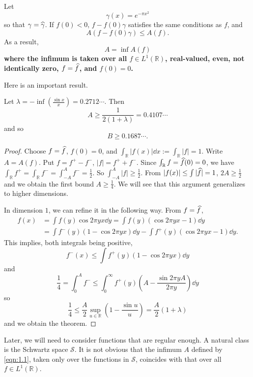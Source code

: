 Let
\[
    \gamma(x) = e^{-\pi x^2}
\]
so that $\gamma = \widehat{\gamma}$.
If $f(0) < 0$, $f - f(0)\gamma$ satisfies the same conditions as $f$, and
\[
    A(f - f(0)\gamma) \leq A(f).
\]
As a result,
\begin{equation}
\label{eqn:1.1}
    A = \inf A(f)
\end{equation}
\textbf{where the infimum is taken over all $f \in L^{1}(\mathbb{R})$, real-valued, even, not identically zero, $f = \widehat{f}$, and $f(0) = 0$.}

Here is an important result.

\begin{theorem}
\label{thm:1.1}
Let $\lambda = -\inf\left( \frac{\sin x}{x}\right) = 0.2712\cdots$.
Then
\[
    A \geq \frac{1}{2(1 + \lambda)} = 0.4107\cdots
\]
and so
\[
    B \geq 0.1687\cdots.
\]
\end{theorem}
\begin{proof}
Choose $f = \widehat{f}$, $f(0) = 0$, and $\int_{\mathbb{R}} |f(x)| \dd x := \int_{\mathbb{R}} |f| = 1$.
Write $A = A(f)$.
Put $f = f^{+} - f^{-}$, $|f| = f^{+} + f^{-}$.
Since $\int_{\mathbb{R}}f = \widehat{f}(0) = 0$, we have $\int_{\mathbb{R}} f^{+} = \int_{\mathbb{R}} f^{-} = \int_{-A}^{A} f^{-} = \frac{1}{2}$.
So $\int_{-A}^{A} |f| \geq \frac{1}{2}$.
From $|f(x)| \leq \int |\widehat{f}| = 1$, $2A \geq \frac{1}{2}$ and we obtain the first bound $A \geq \frac{1}{4}$.
We will see that this argument generalizes to higher dimensions.

In dimension $1$, we can refine it in the following way.
From $f = \widehat{f}$,
\begin{align*}
    f(x) &= \int f(y) \cos 2 \pi y x \dd y = \int f(y) (\cos 2 \pi y x - 1) \dd y \\
    &= \int f^{-}(y) (1 - \cos 2 \pi y x) \dd y - \int f^{+}(y) (\cos 2 \pi y x - 1) \dd y.
\end{align*}
This implies, both integrals being positive,
\[
    f^{-}(x) \leq \int f^{+}(y) (1 - \cos 2 \pi y x) \dd y
\]
and
\[
    \frac{1}{4} = \int_{0}^{A} f^{-} \leq \int_{0}^{\infty} f^{+}(y) \left(A - \frac{\sin 2 \pi y A}{2 \pi y}\right) \dd y
\]
so
\[
    \frac{1}{4} \leq \frac{A}{2}\sup_{u \in \mathbb{R}} \left(1 - \frac{\sin u}{u}\right) = \frac{A}{2}(1 + \lambda)
\]
and we obtain the theorem.
\end{proof}
Later, we will need to consider functions that are regular enough.
A natural class is the Schwartz space $\mathcal{S}$.
It is not obvious that the infimum $A$ defined by \eqref{eqn:1.1}, taken only over the functions in $\mathcal{S}$, coincides with that over all $f \in L^{1}(\mathbb{R})$.


